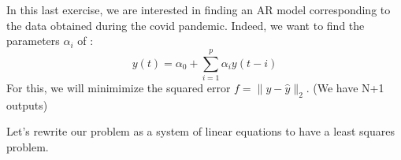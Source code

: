 \documentclass[11pt]{article}
\begin{document}
In this last exercise, we are interested in finding an AR model corresponding to the data obtained during the covid pandemic. Indeed, we want to find the parameters $\alpha_i$ of :
\[y(t) = \alpha_0 + \sum_{i=1}^p \alpha_iy(t-i)
\]
For this, we will minimimize the squared error $f = \|y-\hat{y} \|_2$. (We have N+1 outputs)

\begin{comment}
We will differenciate this error with respect to the parameters to find the minima. This gives us:


\begin{align*}
f &= \|y-\hat{y} \|_2 = \sum_{t=0}^N (y(t) - \alpha_0 - \sum_{i=1}^p \alpha_iy(t-i))^2\\
\frac{\partial f}{\partial \alpha_0} &= -2 (\sum_{t=0}^N (y(t) - \alpha_0 - \sum_{i=1}^p \alpha_iy(t-i))) = 0\\ 
\frac{\partial f}{\partial \alpha_i} &= -y(t-i) (\sum_{t=0}^N (y(t) - \alpha_0 - \sum_{i=1}^p \alpha_iy(t-i)))=0 \qquad \qquad i = 1\dots p\\ 
\end{align*}
\end{comment}
Let's rewrite our problem as a system of linear equations to have a least squares problem.
\begin{comment}
\begin{align*}
\hat{y}= \begin{bmatrix}
\hat{y}(0)\\
\vdots\\
\hat{y}(N)\\
\end{bmatrix}= \underbrace{\begin{bmatrix}
1 & 0 & 0 &\dots & 0\\
1 & y(0) & 0& \dots &0\\
1 & y(1) & y(0)& \dots &0\\
\vdots&\vdots &\vdots&\ddots&\\
1 & y(p-1)& y(p-2)&\dots& y(0)\\
1 & y(p)&y(p-1)&\dots& y(1)\\
\vdots&\vdots &\vdots&&\vdots\\
1& y(N-1)&y(N-2)&\dots& y(N-p)\\
\end{bmatrix}}_A
\underbrace{\begin{bmatrix}
\alpha_0\\
\vdots\\
\alpha_p\\
\end{bmatrix}}_x\\
\end{align*}
\end{comment}
\end{document}
